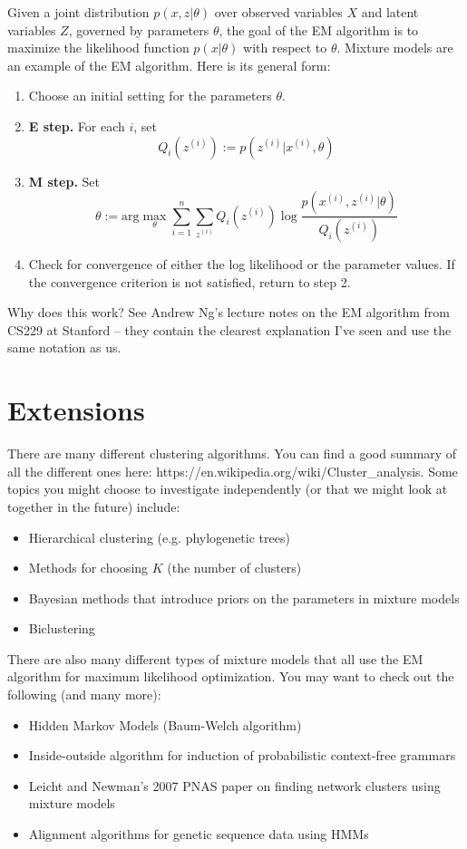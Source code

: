 Given a joint distribution $p(x, z|\theta)$ over observed variables $X$ and latent variables $Z$, governed by parameters $\theta$, the goal of the EM algorithm is to maximize the likelihood function $p(x|\theta)$ with respect to $\theta$. Mixture models are an example of the EM algorithm. Here is its general form:
\begin{enumerate}
\item Choose an initial setting for the parameters $\theta$.
\item \textbf{E step.} For each $i$, set
$$ Q_i (z^{(i)}) := p(z^{(i)}|x^{(i)}, \theta) $$
\item \textbf{M step.} Set
$$ \theta := \text{arg} \max_\theta \sum_{i=1}^n \sum_{z^{(i)}} Q_i (z^{(i)}) \log \frac{p(x^{(i)}, z^{(i)}|\theta)}{Q_i(z^{(i)})} $$
\item Check for convergence of either the log likelihood or the parameter values. If the convergence criterion is not satisfied, return to step 2.
\end{enumerate}

Why does this work? See Andrew Ng's lecture notes on the EM algorithm from CS229 at Stanford -- they contain the clearest explanation I've seen and use the same notation as us.


\section{Extensions}

There are many different clustering algorithms. You can find a good summary of all the different ones here: https://en.wikipedia.org/wiki/Cluster\_analysis. Some topics you might choose to investigate independently (or that we might look at together in the future) include:

\begin{itemize}
\item Hierarchical clustering (e.g. phylogenetic trees)
\item Methods for choosing $K$ (the number of clusters)
\item Bayesian methods that introduce priors on the parameters in mixture models
\item Biclustering
\end{itemize}

There are also many different types of mixture models that all use the EM algorithm for maximum likelihood optimization. You may want to check out the following (and many more):

\begin{itemize}
\item Hidden Markov Models (Baum-Welch algorithm)
\item Inside-outside algorithm for induction of probabilistic context-free grammars 
\item Leicht and Newman's 2007 PNAS paper on finding network clusters using mixture models
\item Alignment algorithms for genetic sequence data using HMMs
\end{itemize}

